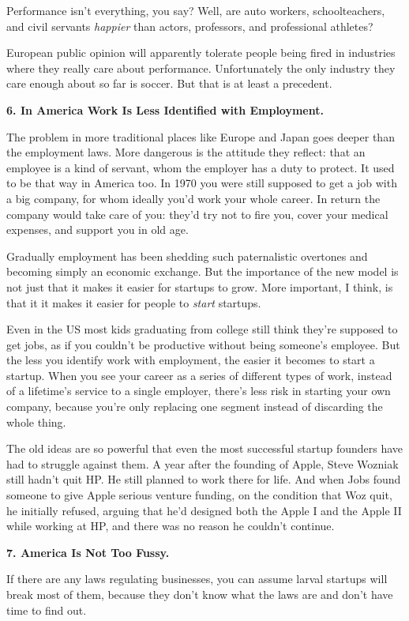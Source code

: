 Performance isn't everything, you say? Well, are auto workers,
schoolteachers, and civil servants \emph{happier} than actors,
professors, and professional athletes?

European public opinion will apparently tolerate people being fired in
industries where they really care about performance. Unfortunately the
only industry they care enough about so far is soccer. But that is at
least a precedent.

\textbf{6. In America Work Is Less Identified with Employment.}

The problem in more traditional places like Europe and Japan goes deeper
than the employment laws. More dangerous is the attitude they reflect:
that an employee is a kind of servant, whom the employer has a duty to
protect. It used to be that way in America too. In 1970 you were still
supposed to get a job with a big company, for whom ideally you'd work
your whole career. In return the company would take care of you: they'd
try not to fire you, cover your medical expenses, and support you in old
age.

Gradually employment has been shedding such paternalistic overtones and
becoming simply an economic exchange. But the importance of the new
model is not just that it makes it easier for startups to grow. More
important, I think, is that it it makes it easier for people to
\emph{start} startups.

Even in the US most kids graduating from college still think they're
supposed to get jobs, as if you couldn't be productive without being
someone's employee. But the less you identify work with employment, the
easier it becomes to start a startup. When you see your career as a
series of different types of work, instead of a lifetime's service to a
single employer, there's less risk in starting your own company, because
you're only replacing one segment instead of discarding the whole thing.

The old ideas are so powerful that even the most successful startup
founders have had to struggle against them. A year after the founding of
Apple, Steve Wozniak still hadn't quit HP. He still planned to work
there for life. And when Jobs found someone to give Apple serious
venture funding, on the condition that Woz quit, he initially refused,
arguing that he'd designed both the Apple I and the Apple II while
working at HP, and there was no reason he couldn't continue.

\textbf{7. America Is Not Too Fussy.}

If there are any laws regulating businesses, you can assume larval
startups will break most of them, because they don't know what the laws
are and don't have time to find out.

